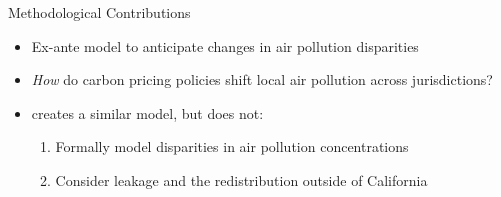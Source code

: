 \documentclass[11pt, aspectratio = 169]{beamer}
\newcommand{\1}{\mathds{1}}
\begin{document}
\begin{frame}{Methodological Contributions}
    
\begin{itemize}
    \item Ex-ante model to anticipate changes in air pollution disparities
    \vfill 
    \item \emph{How} do carbon pricing policies shift local air pollution across jurisdictions?
    \vfill
    \item \cite{weber2021dynamic} creates a similar model, but does not:
    \begin{enumerate}
        \item Formally model disparities in air pollution concentrations
        \item Consider leakage and the redistribution outside of California
    \end{enumerate}
\end{itemize}

\end{frame}

    



\end{document}
